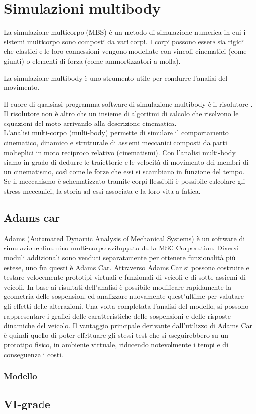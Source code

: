 \chapter{Simulazioni multibody}
\label{cha:cap5}
La simulazione multicorpo (MBS) è un metodo di simulazione numerica in cui i sistemi multicorpo sono composti da vari corpi. I corpi possono essere sia rigidi che elastici e le loro connessioni vengono modellate con vincoli cinematici (come giunti) o elementi di forza (come ammortizzatori a molla).

La simulazione multibody è uno strumento utile per condurre l'analisi del movimento.

Il cuore di qualsiasi programma software di 
simulazione multibody è il risolutore .
Il risolutore non è altro che un insieme di 
algoritmi di calcolo che risolvono le equazioni del moto arrivando alla descrizione cinematica.\\
L’analisi multi-corpo (multi-body) permette di simulare il comportamento 
cinematico, dinamico e strutturale di assiemi meccanici composti da parti 
molteplici in moto reciproco relativo (cinematismi).
Con l’analisi multi-body siamo in grado di dedurre le traiettorie e le 
velocità di movimento dei membri di un cinematismo, così come le forze che 
essi si scambiano in funzione del tempo.
Se il meccanismo è schematizzato tramite corpi flessibili è possibile 
calcolare gli stress meccanici, la storia ad essi associata e la loro vita 
a fatica.

\section{Adams car}
Adams (Automated Dynamic Analysis of Mechanical Systems) è un software di simulazione
dinamico multi-corpo sviluppato dalla MSC Corporation. Diversi moduli addizionali sono
venduti separatamente per ottenere funzionalità più estese, uno fra questi è Adams Car.
Attraverso Adams Car si possono costruire e testare velocemente prototipi virtuali e funzionali
di veicoli e di sotto assiemi di veicoli.
In base ai risultati dell'analisi è possibile modificare rapidamente la geometria delle sospensioni
ed analizzare nuovamente quest’ultime per valutare gli effetti delle alterazioni.
Una volta completata l'analisi del modello, si possono rappresentare i grafici delle
caratteristiche delle sospensioni e delle risposte dinamiche del veicolo.
Il vantaggio principale derivante dall’utilizzo di Adams Car è quindi quello di poter effettuare
gli stessi test che si eseguirebbero su un prototipo fisico, in ambiente virtuale, riducendo
notevolmente i tempi e di conseguenza i costi.
\subsection{Modello}

\section{VI-grade}